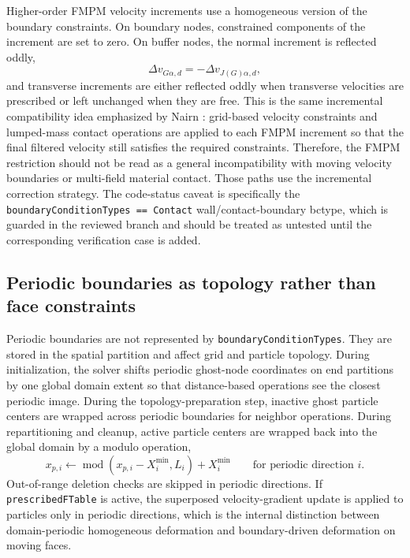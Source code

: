 Higher-order FMPM velocity increments use a homogeneous version of the boundary constraints.  On boundary nodes, constrained components of the increment are set to zero.  On buffer nodes, the normal increment is reflected oddly,
\begin{equation}
  \Delta v_{G\alpha,d}=-\Delta v_{J(G)\alpha,d},
\end{equation}
and transverse increments are either reflected oddly when transverse velocities are prescribed or left unchanged when they are free.  This is the same incremental compatibility idea emphasized by Nairn \cite{nairn2026fmpm}: grid-based velocity constraints and lumped-mass contact operations are applied to each FMPM increment so that the final filtered velocity still satisfies the required constraints.  Therefore, the FMPM restriction should not be read as a general incompatibility with moving velocity boundaries or multi-field material contact.  Those paths use the incremental correction strategy.  The code-status caveat is specifically the \texttt{boundaryConditionTypes == Contact} wall/contact-boundary bctype, which is guarded in the reviewed branch and should be treated as untested until the corresponding verification case is added.

\subsection{Periodic boundaries as topology rather than face constraints}
\label{subsec:bc-periodic-internals}

Periodic boundaries are not represented by \texttt{boundaryConditionTypes}.  They are stored in the spatial partition and affect grid and particle topology.  During initialization, the solver shifts periodic ghost-node coordinates on end partitions by one global domain extent so that distance-based operations see the closest periodic image.  During the topology-preparation step, inactive ghost particle centers are wrapped across periodic boundaries for neighbor operations.  During repartitioning and cleanup, active particle centers are wrapped back into the global domain by a modulo operation,
\begin{equation}
  x_{p,i}\leftarrow \operatorname{mod}(x_{p,i}-X_i^{\min},L_i)+X_i^{\min}
  \qquad\text{for periodic direction } i.
  \label{eq:bc-periodic-wrap}
\end{equation}
Out-of-range deletion checks are skipped in periodic directions.  If \texttt{prescribedFTable} is active, the superposed velocity-gradient update is applied to particles only in periodic directions, which is the internal distinction between domain-periodic homogeneous deformation and boundary-driven deformation on moving faces.






